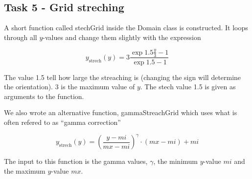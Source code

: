 \documentclass[paper=a4, fontsize=12pt]{article} %
\begin{document}
\subsection*{Task 5 - Grid streching}

A short function called stechGrid inside the Domain class is constructed. It loops through all $y$-values and change them slightly with the expression

$$ y_\textrm{strech}(y) = 3 \frac{\exp{1.5\frac{y}{3}}-1}{\exp{1.5}-1}$$

The value 1.5 tell how large the streaching is (changing the sign will determine the orientation). 3 is the maximum value of $y$. The stech value 1.5 is given as arguments to the function.

We also wrote an alternative function, gammaStreachGrid which uses what is often refered to as ``gamma correction''

$$ y_\textrm{strech}(y) =  \left ( \frac{y-mi}{mx-mi}\right )^\gamma \cdot (mx-mi) + mi$$

The input to this function is the gamma values, $\gamma$, the minimum $y$-value $mi$ and the maximum $y$-value $mx$.
\end{document}
